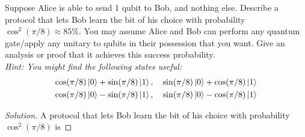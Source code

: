 \begin{solution}[label=ques:1a]
  \begin{question}
    Suppose Alice is able to send 1 qubit to Bob, and nothing else.
Describe a protocol that lets Bob learn the bit of his choice with
probability $\cos^2(\pi/8) \approx 85\%$. You may assume Alice and Bob can perform any quantum gate/apply any unitary to qubits in their possession that you want.
Give an analysis or proof that it achieves this success probability.
\\ \textit{Hint: You might find the following states useful:}
\begin{gather*}
\cos(\pi/8)\ket{0}+\sin(\pi/8)\ket{1},\quad \sin(\pi/8)\ket{0}+\cos(\pi/8)\ket{1}\\
\cos(\pi/8)\ket{0}-\sin(\pi/8)\ket{1},\quad \sin(\pi/8)\ket{0}-\cos(\pi/8)\ket{1}
\end{gather*}
  \end{question}
  \tcblower{}
  \begin{proof}[Solution]
    A protocol that lets Bob learn the bit of his choice with probability $\cos^2(\pi/8)$ is


\end{proof}
\end{solution}
